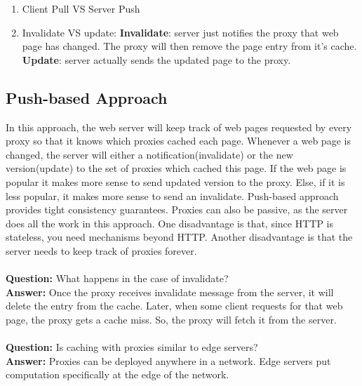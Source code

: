 \documentclass[twoside]{article}
\begin{document}
\begin{enumerate}
    \item Client Pull VS Server Push
    \item Invalidate VS update: 
        \subitem \textbf{Invalidate}: server just notifies the proxy that web page has changed. The proxy will then remove the page entry from it's cache. 
        \subitem \textbf{Update}: server actually sends the updated page to the proxy. 
\end{enumerate}

\subsection{Push-based Approach}
In this approach, the web server will keep track of web pages requested by every proxy so that it knows which proxies cached each page. Whenever a web page is changed, the server will either a notification(invalidate) or the new version(update) to the set of proxies which cached this page. If the web page is popular it makes more sense to send updated version to the proxy. Else, if it is less popular, it makes more sense to send an invalidate. Push-based approach provides tight consistency guarantees. Proxies can also be passive, as the server does all the work in this approach. One disadvantage is that, since HTTP is stateless, you need mechanisms beyond HTTP. Another disadvantage is that the server needs to keep track of proxies forever.\\\\
\textbf{Question:} What happens in the case of invalidate?\\
\textbf{Answer:} Once the proxy receives invalidate message from the server, it will delete the entry from the cache. Later, when some client requests for that web page, the proxy gets a cache miss. So, the proxy will fetch it from the server.\\\\
\textbf{Question:} Is caching with proxies similar to edge servers?\\
\textbf{Answer:} Proxies can be deployed anywhere in a network. Edge servers put computation specifically at the edge of the network.
\end{document}
